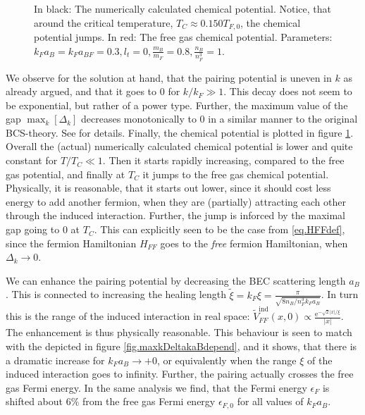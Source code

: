 \begin{figure} 
\begin{center}  
  
\caption{In black: The numerically calculated chemical potential. Notice, that around the critical temperature, $T_C \approx 0.150 T_{F,0}$, the chemical potential jumps. In red: The free gas chemical potential. Parameters: $k_F a_B = k_F a_{BF} = 0.3, l_t = 0, \frac{m_B}{m_F} = 0.8, \frac{n_B}{n_F^3} = 1$. }  
\label{fig.chempot}  
\end{center}    
\end{figure}

 We observe for the solution at hand, that the pairing potential is uneven in $k$ as already argued, and that it goes to 0 for $k/k_F \gg 1$. This decay does not seem to be exponential, but rather of a power type. Further, the maximum value of the gap $\max_k[\Delta_k]$ decreases monotonically to 0 in a similar manner to the original BCS-theory. See \cite{Tinkham,BruusFlensberg,PlischkeStatPhys} for details. Finally, the chemical potential is plotted in figure \ref{fig.chempot}. Overall the (actual) numerically calculated chemical potential is lower and quite constant for $T/T_C \ll 1$. Then it starts rapidly increasing, compared to the free gas potential, and finally at $T_C$ it jumps to the free gas chemical potential. Physically, it is reasonable, that it starts out lower, since it should cost less energy to add another fermion, when they are (partially) attracting each other through the induced interaction. Further, the jump is inforced by the maximal gap going to $0$ at $T_C$. This can explicitly seen to be the case from \eqref{eq.HFFdef}, since the fermion Hamiltonian $H_{FF}$ goes to the \textit{free} fermion Hamiltonian, when $\Delta_k \to 0$. 

 We can enhance the pairing potential by decreasing the BEC scattering length $a_B$. This is connected to increasing the healing length $\tilde{\xi} = k_F\xi = \frac{\pi}{\sqrt{8 n_B/n_F^3 k_Fa_B}}$. In turn this is the range of the induced interaction in real space: $\tilde{V}_{FF}^\text{ind}(x,0) \propto \frac{\text{e}^{-\sqrt{2}|x|/\xi}}{|x|}$. The enhancement is thus physically reasonable. This behaviour is seen to match with the depicted in figure \ref{fig.maxkDeltakaBdepend}, and it shows, that there is a dramatic increase for $k_Fa_B \to +0$, or equivalently when the range $\xi$ of the induced interaction goes to infinity. Further, the pairing actually crosses the free gas Fermi energy. In the same analysis we find, that the Fermi energy $\epsilon_F$ is shifted about $6\%$ from the free gas Fermi energy $\epsilon_{F,0}$ for all values of $k_F a_B$.  

